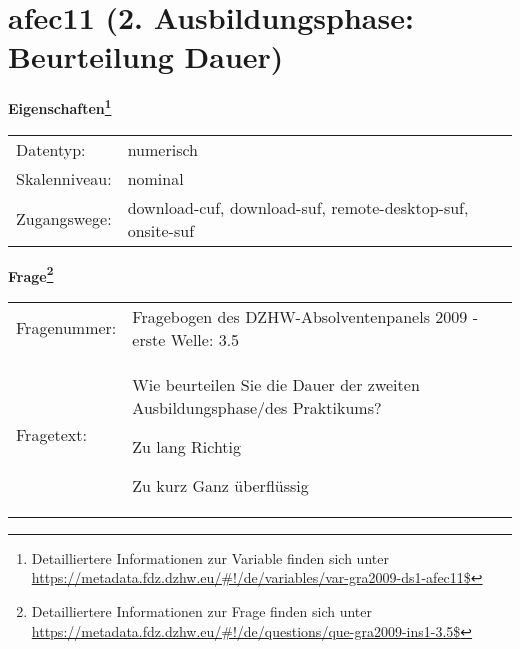 
    \setcounter{footnote}{0}

    \vspace*{-1.8cm}
	\section{afec11 (2. Ausbildungsphase: Beurteilung Dauer)}
	\label{section:afec11}



    \vspace*{0.5cm}
    \noindent\textbf{Eigenschaften\footnote{Detailliertere Informationen zur Variable finden sich unter
		\url{https://metadata.fdz.dzhw.eu/\#!/de/variables/var-gra2009-ds1-afec11$}}}\\
	\begin{tabularx}{\hsize}{@{}lX}
	Datentyp: & numerisch \\
	Skalenniveau: & nominal \\
	Zugangswege: &
	  download-cuf, 
	  download-suf, 
	  remote-desktop-suf, 
	  onsite-suf
 \\
    \end{tabularx}



				\vspace*{0.5cm}
                \noindent\textbf{Frage\footnote{Detailliertere Informationen zur Frage finden sich unter
		              \url{https://metadata.fdz.dzhw.eu/\#!/de/questions/que-gra2009-ins1-3.5$}}}\\
				\begin{tabularx}{\hsize}{@{}lX}
					Fragenummer: &
					  Fragebogen des DZHW-Absolventenpanels 2009 - erste Welle:
					  3.5
 \\
					Fragetext: & Wie beurteilen Sie die Dauer der zweiten Ausbildungsphase/des Praktikums?\par  Zu lang Richtig\par  Zu kurz Ganz überflüssig \\
				\end{tabularx}





